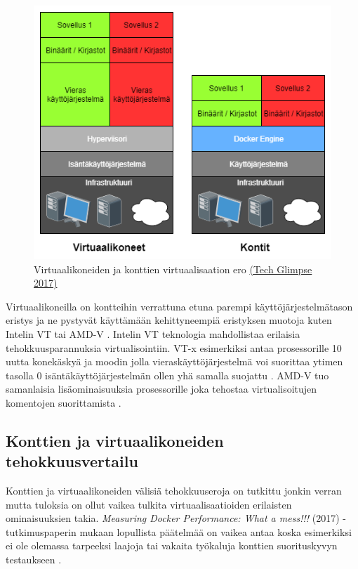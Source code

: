 \documentclass[finnish,gradu]{tktltiki3}
\begin{document}
    \begin{figure}[h]
        \centering
        \includegraphics[width=1\textwidth]{images/Container-vs-VMs.png}
        \caption{Virtuaalikoneiden ja konttien virtuaalisaation ero \href{https://techglimpse.com/docker-installation-tutorial-centos/}{(Tech Glimpse 2017)}}
        \label{fig:c-vs-vm}
    \end{figure}
    
    Virtuaalikoneilla on kontteihin verrattuna etuna parempi käyttöjärjestelmätason eristys ja ne pystyvät käyttämään kehittyneempiä eristyksen muotoja kuten Intelin VT tai AMD-V \cite{openvz-xen-kvm}. Intelin VT teknologia mahdollistaa erilaisia tehokkuusparannuksia virtualisointiin. VT-x esimerkiksi antaa prosessorille 10 uutta konekäskyä \cite{vt-x-overview} ja moodin jolla vieraskäyttöjärjestelmä voi suorittaa ytimen tasolla 0 isäntäkäyttöjärjestelmän ollen yhä samalla suojattu \cite{vt-x-analysis}. AMD-V tuo samanlaisia lisäominaisuuksia prosessorille joka tehostaa virtualisoitujen komentojen suorittamista \cite{amd-v-snippet}.
    
    \subsection{Konttien ja virtuaalikoneiden tehokkuusvertailu}
    
    Konttien ja virtuaalikoneiden välisiä tehokkuuseroja on tutkittu jonkin verran mutta tuloksia on ollut vaikea tulkita virtuaalisaatioiden erilaisten ominaisuuksien takia. \textit{Measuring Docker Performance: What a mess!!!} (2017) -tutkimuspaperin mukaan lopullista päätelmää on vaikea antaa koska esimerkiksi ei ole olemassa tarpeeksi laajoja tai vakaita työkaluja konttien suorituskyvyn testaukseen \cite{docker-mess}. 
    
\end{document}
